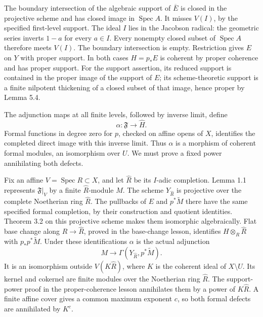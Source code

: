 \documentclass[11pt]{article}
\begin{document}
The boundary intersection of the algebraic support of \(\overline E\) is
closed in the projective scheme and has closed image in
\(\operatorname{Spec}A\). It misses \(V(I)\), by the specified
first-level support. The ideal \(I\) lies in the Jacobson radical: the
geometric series inverts \(1-a\) for every \(a\in I\). Every nonempty
closed subset of \(\operatorname{Spec}A\) therefore meets \(V(I)\). The
boundary intersection is empty. Restriction gives \(E\) on \(Y\) with
proper support. In both cases \(H=p_*E\) is coherent by proper coherence
and has proper support. For the support assertion, its reduced support
is contained in the proper image of the support of \(E\); its
scheme-theoretic support is a finite nilpotent thickening of a closed
subset of that image, hence proper by Lemma 5.4.

The adjunction maps at all finite levels, followed by inverse limit,
define \[
\alpha:\mathfrak F\longrightarrow\widehat H.
\] Formal functions in degree zero for \(p\), checked on affine opens of
\(X\), identifies the completed direct image with this inverse limit.
Thus \(\alpha\) is a morphism of coherent formal modules, an isomorphism
over \(U\). We must prove a fixed power annihilating both defects.

Fix an affine \(V=\operatorname{Spec}R\subset X\), and let
\(\widehat R\) be its \(I\)-adic completion. Lemma 1.1 represents
\(\mathfrak F|_V\) by a finite \(\widehat R\)-module \(M\). The scheme
\(Y_{\widehat R}\) is projective over the complete Noetherian ring
\(\widehat R\). The pullbacks of \(E\) and \(p^*\widetilde M\) there
have the same specified formal completion, by their construction and
quotient identities. Theorem 3.2 on this projective scheme makes them
isomorphic algebraically. Flat base change along \(R\to\widehat R\),
proved in the base-change lesson, identifies \(H\otimes_R\widehat R\)
with \(p_*p^*\widetilde M\). Under these identifications \(\alpha\) is
the actual adjunction \[
M\longrightarrow\Gamma(Y_{\widehat R},p^*\widetilde M).
\] It is an isomorphism outside \(V(K\widehat R)\), where \(K\) is the
coherent ideal of \(X\setminus U\). Its kernel and cokernel are finite
modules over the Noetherian ring \(\widehat R\). The support-power proof
in the proper-coherence lesson annihilates them by a power of
\(K\widehat R\). A finite affine cover gives a common maximum exponent
\(c\), so both formal defects are annihilated by \(K^c\).
\end{document}
